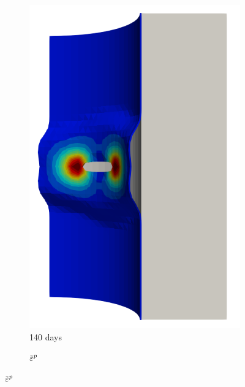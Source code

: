 \begin{figure}[!htb]
\begin{subfigure}[b]{0.2\textwidth}
    \includegraphics[width=\textwidth]{Chapter5/figures/spallation/seed_ep_4}
    \caption{140 days}
  \end{subfigure}
  \begin{subfigure}[b]{0.1\textwidth}
    \centering
    \caption*{$\ep$}

\end{subfigure}
\end{figure}

